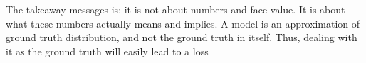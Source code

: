   \par The takeaway messages is: it is not about numbers and face value. It is about what these numbers actually means and implies. A model is an approximation of ground truth distribution, and not the ground truth in itself. Thus, dealing with it as the ground truth will easily lead to a loss

